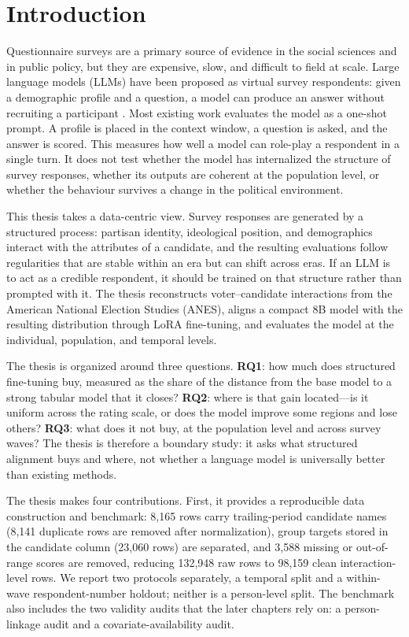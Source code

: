 \chapter{Introduction}
\label{ch:intro}

Questionnaire surveys are a primary source of evidence in the social sciences and
in public policy, but they are expensive, slow, and difficult to field at scale.
Large language models (LLMs) have been proposed as virtual survey respondents:
given a demographic profile and a question, a model can produce an answer without
recruiting a participant \citep{argyle2023,aher2023multiple,dillion2023,kim2023,tourangeau2000survey}. Most existing
work evaluates the model as a one-shot prompt. A profile is placed in the context
window, a question is asked, and the answer is scored. This measures how well a
model can role-play a respondent in a single turn. It does not test whether the
model has internalized the structure of survey responses, whether its outputs are
coherent at the population level, or whether the behaviour survives a change in
the political environment.

This thesis takes a data-centric view. Survey responses are generated by a
structured process: partisan identity, ideological position, and demographics
interact with the attributes of a candidate, and the resulting evaluations follow
regularities that are stable within an era but can shift across eras. If an LLM
is to act as a credible respondent, it should be trained on that structure rather
than prompted with it. The thesis reconstructs voter--candidate interactions from
the American National Election Studies (ANES), aligns a compact 8B model with the
resulting distribution through LoRA fine-tuning, and evaluates the model at the
individual, population, and temporal levels.

The thesis is organized around three questions. \textbf{RQ1}: how much does
structured fine-tuning buy, measured as the share of the distance from the base
model to a strong tabular model that it closes? \textbf{RQ2}:
where is that gain located---is it uniform across the rating scale, or does the
model improve some regions and lose others? \textbf{RQ3}: what does it not buy,
at the population level and across survey waves? The thesis is therefore a
boundary study: it asks what structured alignment buys and where, not whether a
language model is universally better than existing methods.

The thesis makes four contributions. First, it provides a reproducible data
construction and benchmark: 8,165 rows carry trailing-period candidate names
(8,141 duplicate rows are removed after normalization), group targets stored in
the candidate column (23,060 rows) are separated, and 3,588 missing or
out-of-range scores are removed, reducing 132,948 raw rows to 98,159 clean
interaction-level rows. We report two protocols separately, a temporal split and
a within-wave respondent-number holdout; neither is a person-level split. The
benchmark also includes the two validity audits that the later chapters rely on:
a person-linkage audit and a covariate-availability audit.


